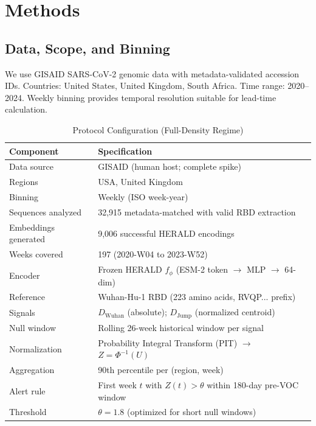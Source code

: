 \documentclass[11pt]{article}
\begin{document}
\section{Methods}
\subsection{Data, Scope, and Binning}
We use GISAID SARS-CoV-2 genomic data with metadata-validated accession IDs. Countries: United States, United Kingdom, South Africa. Time range: 2020--2024. Weekly binning provides temporal resolution suitable for lead-time calculation.

\begin{table}[H]
\centering
\caption{Protocol Configuration (Full-Density Regime)}
\label{tab:config}
\begin{tabular}{ll}
\toprule
\textbf{Component} & \textbf{Specification} \\
\midrule
Data source & GISAID (human host; complete spike) \\
Regions & USA, United Kingdom \\
Binning & Weekly (ISO week-year) \\
Sequences analyzed & 32,915 metadata-matched with valid RBD extraction \\
Embeddings generated & 9,006 successful HERALD encodings \\
Weeks covered & 197 (2020-W04 to 2023-W52) \\
Encoder & Frozen HERALD $f_{\phi}$ (ESM-2 token $\rightarrow$ MLP $\rightarrow$ 64-dim) \\
Reference & Wuhan-Hu-1 RBD (223 amino acids, RVQP... prefix) \\
Signals & $D_{\text{Wuhan}}$ (absolute); $D_{\text{Jump}}$ (normalized centroid) \\
Null window & Rolling 26-week historical window per signal \\
Normalization & Probability Integral Transform (PIT) $\rightarrow$ $Z=\Phi^{-1}(U)$ \\
Aggregation & 90th percentile per (region, week) \\
Alert rule & First week $t$ with $Z(t)>\theta$ within 180-day pre-VOC window \\
Threshold & $\theta = 1.8$ (optimized for short null windows) \\
\bottomrule
\end{tabular}
\end{table}
\end{document}
